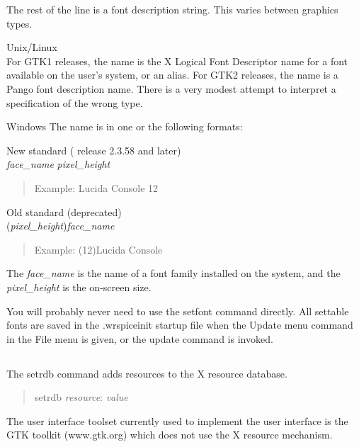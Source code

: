 The rest of the line is a font description string.  This varies
between graphics types.

\begin{description}
\item{Unix/Linux}\\
For GTK1 releases, the name is the X Logical Font Descriptor name for
a font available on the user's system, or an alias.  For GTK2
releases, the name is a Pango font description name.  There is a very
modest attempt to interpret a specification of the wrong type.
  
\item{Windows}
The name is in one or the following formats:
 \begin{description}
 \item{New standard ({\WRspice} release 2.3.58 and later)}\\
 {\it face\_name} {\it pixel\_height}
 \begin{quote}
 Example: {\vt Lucida Console 12}
 \end{quote}

 \item{Old standard (deprecated)}\\
 ({\it pixel\_height\/}){\it face\_name}
 \begin{quote}
 Example: {\vt (12)Lucida Console}
 \end{quote}
 \end{description}

 The {\it face\_name} is the name of a font family installed on the
 system, and the {\it pixel\_height} is the on-screen size.
\end{description}

You will probably never need to use the {\cb setfont} command
directly.  All settable fonts are saved in the {\vt .wrspiceinit}
startup file when the {\cb Update} menu command in the {\cb File} menu
is given, or the {\cb update} command is invoked.

\subsection{}


The {\cb setrdb} command adds resources to the X resource database.
\begin{quote}\vt
setrdb {\it resource\/}: {\it value}
\end{quote}
The user interface toolset currently used to implement the {\WRspice}
user interface is the GTK toolkit ({\vt www.gtk.org}) which does not
use the X resource mechanism.

